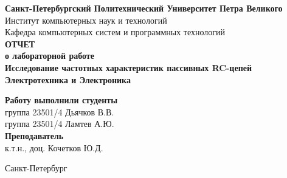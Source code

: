 \begin{titlepage}	%

	\begin{center}		%

		 \textbf{Санкт-Петербургский Политехнический Университет Петра Великого}\\[0.3cm]
		 \small Институт компьютерных наук и технологий \\[0.3cm]
		 \small Кафедра компьютерных систем и программных технологий\\[4cm]
		
		 \textbf{ОТЧЕТ}\\ \textbf{о лабораторной работе}\\[0.5cm]
		 \textbf{Исследование частотных характеристик пассивных RC-цепей}\\[0.1cm]
		 \textbf{Электротехника и Электроника}\\[10.5cm]

	\end{center}


	\begin{flushright} %
		\begin{minipage}{0.60\textwidth} %
			\begin{flushleft} %

				 \small \textbf{Работу выполнили студенты}\\
				 \small группа 23501/4\hspace*{17mm}   Дьячков В.В.\\[0.5cm]
				 \small группа 23501/4\hspace*{17mm}   Ламтев А.Ю.\\[0.5cm]
				
				\small \textbf{Преподаватель}\\[5mm]
			 	\small \sign[3.5cm]   \hspace*{8mm}к.т.н., доц. Кочетков Ю.Д.\\[0.5cm]

			\end{flushleft}
		\end{minipage}
	\end{flushright}
	
	\vfill %

	\begin{center}
	\small Санкт-Петербург\\
	\small \the\year %
	\end{center} %

\thispagestyle{empty} %
\end{titlepage} %

\vfill %
